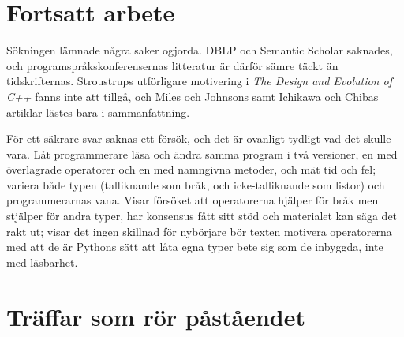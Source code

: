 \section{Fortsatt arbete}
\label{sec:ovl-fortsatt}

Sökningen lämnade några saker ogjorda.  DBLP och Semantic Scholar
saknades, och programspråkskonferensernas litteratur är därför sämre
täckt än tidskrifternas.  Stroustrups utförligare motivering i
\emph{The Design and Evolution of C++} fanns inte att tillgå, och Miles
och Johnsons samt Ichikawa och Chibas artiklar\autocite{MilesJohnson1998,IchikawaChiba2017}
lästes bara i sammanfattning.

För ett säkrare svar saknas ett försök, och det är ovanligt tydligt vad
det skulle vara.  Låt programmerare läsa och ändra samma program i två
versioner, en med överlagrade operatorer och en med namngivna metoder,
och mät tid och fel; variera både typen (talliknande som bråk, och
icke-talliknande som listor) och programmerarnas vana.  Visar försöket
att operatorerna hjälper för bråk men stjälper för andra typer, har
konsensus fått sitt stöd och materialet kan säga det rakt ut; visar det
ingen skillnad för nybörjare bör texten motivera operatorerna med att de
är Pythons sätt att låta egna typer bete sig som de inbyggda, inte med
läsbarhet.

\section{Träffar som rör påståendet}
\label{sec:ovl-traffar}

